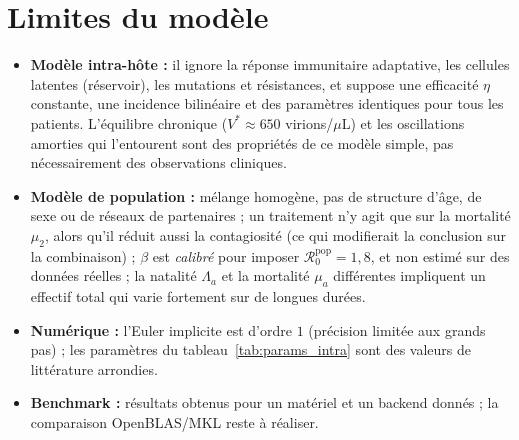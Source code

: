 \documentclass[11pt,a4paper]{report}
\theoremstyle{plain}
\theoremstyle{definition}
\theoremstyle{remark}
\newcommand{\Rzero}{\mathcal{R}_0}
\begin{document}
\section*{Limites du modèle}

\begin{itemize}
    \item \textbf{Modèle intra-hôte :} il ignore la réponse immunitaire adaptative, les cellules latentes (réservoir), les mutations et résistances, et suppose une efficacité $\eta$ constante, une incidence bilinéaire et des paramètres identiques pour tous les patients. L'équilibre chronique ($V^*\approx650$ virions/$\mu$L) et les oscillations amorties qui l'entourent sont des propriétés de ce modèle simple, pas nécessairement des observations cliniques.
    \item \textbf{Modèle de population :} mélange homogène, pas de structure d'âge, de sexe ou de réseaux de partenaires ; un traitement n'y agit que sur la mortalité $\mu_2$, alors qu'il réduit aussi la contagiosité (ce qui modifierait la conclusion sur la combinaison) ; $\beta$ est \emph{calibré} pour imposer $\Rzero^{\mathrm{pop}}=1{,}8$, et non estimé sur des données réelles ; la natalité $\Lambda_a$ et la mortalité $\mu_a$ différentes impliquent un effectif total qui varie fortement sur de longues durées.
    \item \textbf{Numérique :} l'Euler implicite est d'ordre $1$ (précision limitée aux grands pas) ; les paramètres du tableau~\ref{tab:params_intra} sont des valeurs de littérature arrondies.
    \item \textbf{Benchmark :} résultats obtenus pour un matériel et un backend donnés ; la comparaison OpenBLAS/MKL reste à réaliser.
\end{itemize}
\end{document}

